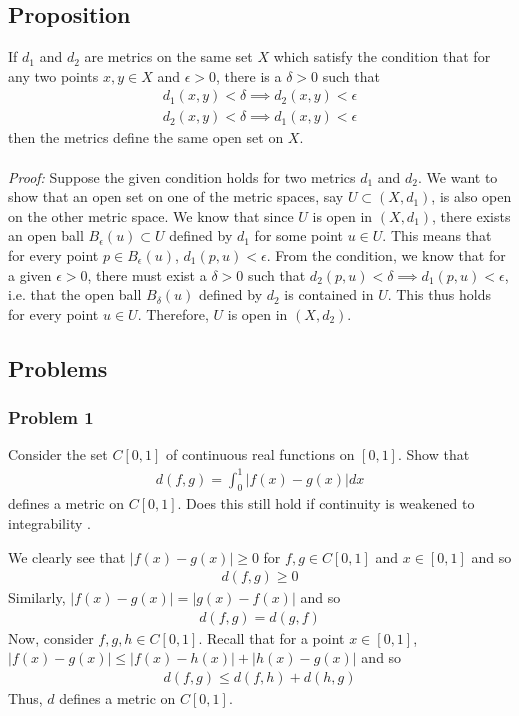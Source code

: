 \documentclass{article}
\begin{document}
	\subsection{Proposition}
	If $d_1$ and $d_2$ are metrics on the same set $X$ which satisfy the condition that for any two points $x, y \in X$ and $\epsilon > 0$, there is a $\delta > 0$ such that
	\begin{gather*}
		d_1(x, y) < \delta \implies d_2(x, y) < \epsilon \\
		d_2(x, y) < \delta \implies d_1(x, y) < \epsilon
	\end{gather*}
	then the metrics define the same open set on $X$.
	\\ \\
	\noindent \textit{Proof:}
	Suppose the given condition holds for two metrics $d_1$ and $d_2$. We want to show that an open set on one of the metric spaces, say $U \subset (X, d_1)$, is also open on the other metric space. We know that since $U$ is open in $(X, d_1)$, there exists an open ball $B_{\epsilon}(u) \subset U$ defined by $d_1$ for some point $u \in U$. This means that for every point $p \in B_{\epsilon}(u)$, $d_1(p, u) < \epsilon$. From the condition, we know that for a given $\epsilon > 0$, there must exist a $\delta > 0$ such that $d_2(p, u) < \delta \implies d_1(p, u) < \epsilon$, i.e. that the open ball $B_{\delta}(u)$ defined by $d_2$ is contained in $U$. This thus holds for every point $u \in U$. Therefore, $U$ is open in $(X, d_2)$.
	
	\subsection*{Problems}
	
	\subsubsection*{Problem 1}
	Consider the set $C[0, 1]$ of continuous real functions on $[0, 1]$. Show that
	\begin{gather*}
		d(f, g) = \int_0^1 |f(x) - g(x)| dx
	\end{gather*}
	defines a metric on $C[0, 1]$. Does this still hold if continuity is weakened to integrability .
	
	We clearly see that $|f(x) - g(x)| \geq 0$ for $f, g \in C[0, 1]$ and $x \in [0, 1]$ and so
	\begin{gather*}
		d(f, g) \geq 0
	\end{gather*}
	Similarly, $|f(x) - g(x)| = |g(x) - f(x)|$ and so
	\begin{gather*}
		d(f, g) = d(g, f)
	\end{gather*}
	Now, consider $f, g, h \in C[0, 1]$. Recall that for a point $x \in [0, 1]$, $|f(x) - g(x)| \leq |f(x) - h(x)| + |h(x) - g(x)|$ and so
	\begin{gather*}
		d(f, g) \leq d(f, h) + d(h, g)
	\end{gather*}
	Thus, $d$ defines a metric on $C[0, 1]$.
	
\end{document}
